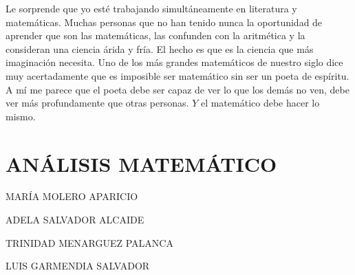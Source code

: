 \documentclass[10pt]{article}
\begin{document}
Le sorprende que yo esté trabajando simultáneamente en literatura y matemáticas. Muchas personas que no han tenido nunca la oportunidad de aprender que son las matemáticas, las confunden con la aritmética y la consideran una ciencia árida y fría. El hecho es que es la ciencia que más imaginación necesita. Uno de los más grandes matemáticos de nuestro siglo dice muy acertadamente que es imposible ser matemático sin ser un poeta de espíritu. A mí me parece que el poeta debe ser capaz de ver lo que los demás no ven, debe ver más profundamente que otras personas. $Y$ el matemático debe hacer lo mismo.

\section*{ANÁLISIS MATEMÁTICO}
MARÍA MOLERO APARICIO

ADELA SALVADOR ALCAIDE

TRINIDAD MENARGUEZ PALANCA

LUIS GARMENDIA SALVADOR
\end{document}
